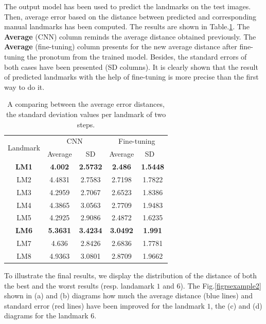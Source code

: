 \documentclass[10pt]{article}
\begin{document}
The output model has been used to predict the landmarks on the test
images. Then, average error based on the distance between
predicted and corresponding manual landmarks has been computed. The results
are shown in Table.\ref{tab2}. The \textbf{Average} (CNN) column reminds
the average distance obtained previously. The \textbf{Average} (fine-tuning)
column presents for the new average distance
after fine-tuning the pronotum from the trained model. Besides, the standard errors of both cases have been presented (SD columns). It is
clearly shown that the result of predicted landmarks with the help of
fine-tuning is more precise than the first way to do it.

\begin{table}[htbp]
\centering
\begin{tabular}{ | c | c | c | c | c | }
\hline
	\multicolumn{1}{|c|}{\multirow{2}{*}{Landmark}} & \multicolumn{2}{c|}{CNN} &  \multicolumn{2}{c|}{Fine-tuning}  \\ \cline{2-5}
	 & Average & SD & Average & SD \  \\ \hline
	\textbf{LM1} & \textbf{4.002} & \textbf{2.5732} & \textbf{2.486} & \textbf{1.5448} \\ \hline
	LM2 & 4.4831 & 2.7583 & 2.7198 & 1.7822 \\ \hline
	LM3 & 4.2959 & 2.7067 & 2.6523 & 1.8386 \\ \hline
	LM4 & 4.3865 & 3.0563 & 2.7709 & 1.9483 \\ \hline
	LM5 & 4.2925 & 2.9086 & 2.4872 & 1.6235 \\ \hline
	\textbf{LM6} & \textbf{5.3631} & \textbf{3.4234} & \textbf{3.0492} & \textbf{1.991} \\ \hline
	LM7 & 4.636 & 2.8426 & 2.6836 & 1.7781 \\ \hline
	LM8 & 4.9363 & 3.0801 & 2.8709 & 1.9662 \\ \hline
\end{tabular}
\caption{\small{A comparing between the average error distances, the standard deviation values per landmark of two steps.}}
\label{tab2}
\end{table}

To illustrate the final results, we display the distribution of the
distance of both the best and the worst results (resp. landamark $1$
and $6$). The Fig.\ref{figrsexample2} shown in (a) and (b) diagrams
 how much the average distance (blue lines) and standard error (red lines) have
 been improved for the landmark $1$, the (c) and (d) diagrams for the
 landmark $6$.
\end{document}
